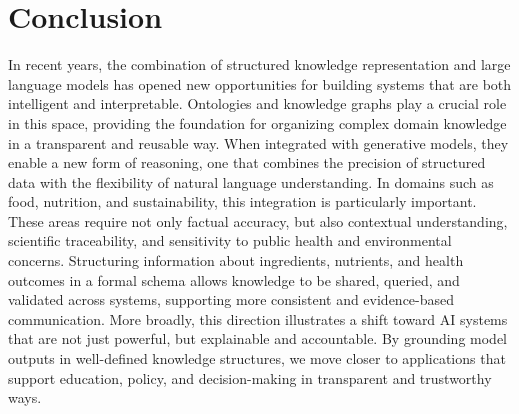 \section{Conclusion}

In recent years, the combination of structured knowledge representation and large language models has opened new opportunities for building systems that are both intelligent and interpretable. Ontologies and knowledge graphs play a crucial role in this space, providing the foundation for organizing complex domain knowledge in a transparent and reusable way. When integrated with generative models, they enable a new form of reasoning, one that combines the precision of structured data with the flexibility of natural language understanding.
In domains such as food, nutrition, and sustainability, this integration is particularly important. These areas require not only factual accuracy, but also contextual understanding, scientific traceability, and sensitivity to public health and environmental concerns. Structuring information about ingredients, nutrients, and health outcomes in a formal schema allows knowledge to be shared, queried, and validated across systems, supporting more consistent and evidence-based communication.
More broadly, this direction illustrates a shift toward AI systems that are not just powerful, but explainable and accountable. By grounding model outputs in well-defined knowledge structures, we move closer to applications that support education, policy, and decision-making in transparent and trustworthy ways.

\newpage